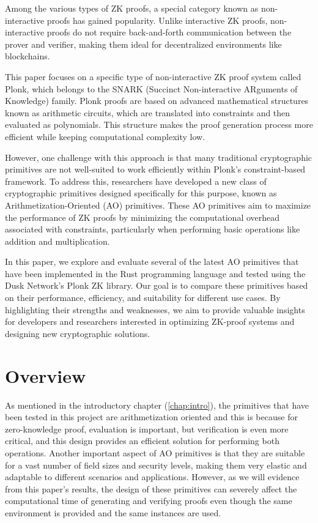 \documentclass[12pt, a4paper]{report}
\begin{document}
Among the various types of ZK proofs, a special category known as non-interactive proofs has gained popularity. Unlike interactive ZK proofs, non-interactive proofs do not require back-and-forth communication between the prover and verifier, making them ideal for decentralized environments like blockchains.

This paper focuses on a specific type of non-interactive ZK proof system called \textsf{Plonk}, which belongs to the SNARK (Succinct Non-interactive ARguments of Knowledge) family. \textsf{Plonk} proofs are based on advanced mathematical structures known as arithmetic circuits, which are translated into constraints and then evaluated as polynomials. This structure makes the proof generation process more efficient while keeping computational complexity low.

However, one challenge with this approach is that many traditional cryptographic primitives are not well-suited to work efficiently within \textsf{Plonk}'s constraint-based framework. To address this, researchers have developed a new class of cryptographic primitives designed specifically for this purpose, known as Arithmetization-Oriented (AO) primitives. These AO primitives aim to maximize the performance of ZK proofs by minimizing the computational overhead associated with constraints, particularly when performing basic operations like addition and multiplication.

In this paper, we explore and evaluate several of the latest AO primitives that have been implemented in the Rust programming language and tested using the Dusk Network's \textsf{Plonk} ZK library. Our goal is to compare these primitives based on their performance, efficiency, and suitability for different use cases. By highlighting their strengths and weaknesses, we aim to provide valuable insights for developers and researchers interested in optimizing ZK-proof systems and designing new cryptographic solutions.

\chapter{Overview}\label{chap:overview}

As mentioned in the introductory chapter (\ref{chap:intro}), the primitives that have been tested in this project are arithmetization oriented and this is because for zero-knowledge proof, evaluation is important, but verification is even more critical, and this design provides an efficient solution for performing both operations.
Another important aspect of AO primitives is that they are suitable for a vast number of field sizes and security levels, making them very elastic and adaptable to different scenarios and applications.
However, as we will evidence from this paper's results, the design of these primitives can severely affect the computational time of generating and verifying proofs even though the same environment is provided and the same instances are used.
\end{document}
